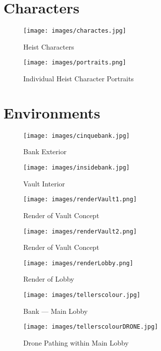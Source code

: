 \documentclass[10pt]{report}
\begin{document}
\section{Characters}

\begin{figure}[H]
    \centering
	\texttt{[image: images/charactes.jpg]}
    \caption{Heist Characters}
\end{figure}

\begin{figure}[H]
    \centering
	\texttt{[image: images/portraits.png]}
    \caption{Individual Heist Character Portraits}
\end{figure}

\section{Environments}

\begin{figure}[H]
    \centering
	\texttt{[image: images/cinquebank.jpg]}
    \caption{Bank Exterior}
\end{figure}

\begin{figure}[H]
    \centering
	\texttt{[image: images/insidebank.jpg]}
    \caption{Vault Interior}
\end{figure}

\begin{figure}[H]
    \centering
	\texttt{[image: images/renderVault1.png]}
    \caption{Render of Vault Concept}
\end{figure}

\begin{figure}[H]
    \centering
	\texttt{[image: images/renderVault2.png]}
    \caption{Render of Vault Concept}
\end{figure}

\begin{figure}[H]
    \centering
	\texttt{[image: images/renderLobby.png]}
    \caption{Render of Lobby}
\end{figure}

\begin{figure}[H]
    \centering
	\texttt{[image: images/tellerscolour.jpg]}
    \caption{Bank --- Main Lobby}
\end{figure}

\begin{figure}[H]
    \centering
	\texttt{[image: images/tellerscolourDRONE.jpg]}
    \caption{Drone Pathing within Main Lobby}
\end{figure}
\end{document}
